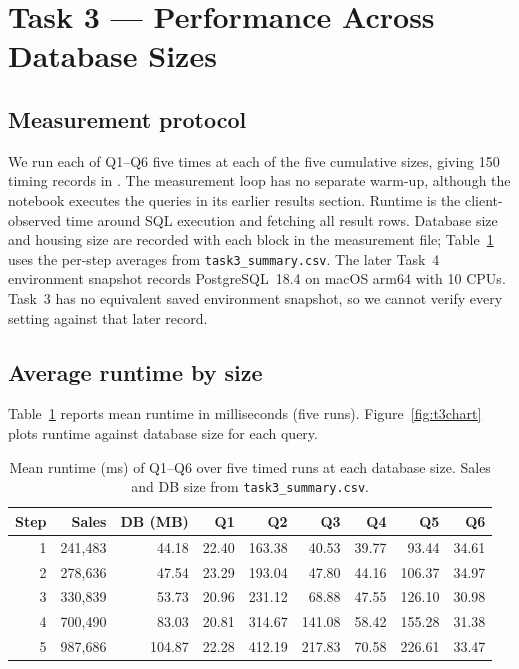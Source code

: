 \section{Task 3 --- Performance Across Database Sizes}

\subsection{Measurement protocol}
We run each of Q1--Q6 five times at each of the five cumulative sizes, giving 150 timing records in . The measurement loop has no separate warm-up, although the notebook executes the queries in its earlier results section.
Runtime is the client-observed time around SQL execution and fetching all result rows.
Database size and housing size are recorded with each block in the measurement file; Table~\ref{tab:t3perf} uses the per-step averages from \texttt{task3\_summary.csv}.
The later Task~4 environment snapshot records PostgreSQL~18.4 on macOS arm64 with 10 CPUs. Task~3 has no equivalent saved environment snapshot, so we cannot verify every setting against that later record.

\subsection{Average runtime by size}
Table~\ref{tab:t3perf} reports mean runtime in milliseconds (five runs).
Figure~\ref{fig:t3chart} plots runtime against database size for each query.

\begin{table}[H]
\centering
\caption{Mean runtime (ms) of Q1--Q6 over five timed runs at each database size. Sales and DB size from \texttt{task3\_summary.csv}.}
\label{tab:t3perf}
\footnotesize
\begin{tabular}{@{}rrrrrrrrr@{}}
\toprule
Step & Sales & DB (MB) & Q1 & Q2 & Q3 & Q4 & Q5 & Q6 \\
\midrule
1 & 241{,}483 & 44.18 & 22.40 & 163.38 & 40.53 & 39.77 & 93.44 & 34.61 \\
2 & 278{,}636 & 47.54 & 23.29 & 193.04 & 47.80 & 44.16 & 106.37 & 34.97 \\
3 & 330{,}839 & 53.73 & 20.96 & 231.12 & 68.88 & 47.55 & 126.10 & 30.98 \\
4 & 700{,}490 & 83.03 & 20.81 & 314.67 & 141.08 & 58.42 & 155.28 & 31.38 \\
5 & 987{,}686 & 104.87 & 22.28 & 412.19 & 217.83 & 70.58 & 226.61 & 33.47 \\
\bottomrule
\end{tabular}
\end{table}

